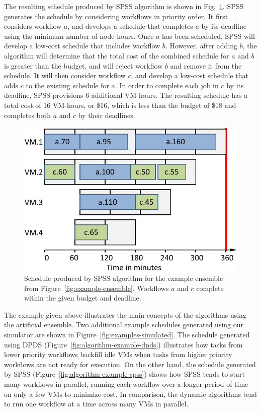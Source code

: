 \documentclass[preprint,5p]{elsarticle}
\begin{document}
The resulting schedule produced by SPSS algorithm is shown in
Fig.~\ref{fig:algorithms-example-spss}. SPSS generates the schedule by
considering workflows in priority order. It first considers workflow $a$, and
develops a schedule that completes $a$ by its deadline using the minimum
number of node-hours. Once $a$ has been scheduled, SPSS will develop a
low-cost schedule that includes workflow $b$. However, after adding $b$,
the algorithm will determine that the total cost of the combined schedule
for $a$ and $b$ is greater than the budget, and will reject workflow $b$ and
remove it from the schedule. It will then consider workflow $c$, and develop
a low-cost schedule that adds $c$ to the existing schedule for $a$. In order
to complete each job in $c$ by its deadline, SPSS provisions 6 additional
VM-hours. The resulting schedule has a total cost of 16 VM-hours, or
\$16, which is less than the budget of \$18 and completes both $a$ and $c$ by
their deadlines.

\begin{figure}[htb] 
  \centering
  \includegraphics[width=0.80\columnwidth]{figures/algorithms-example-spss}
  \caption{Schedule produced by SPSS algorithm for the example ensemble from Figure~\ref{fig:example-ensemble}.
  Workflows $a$ and $c$ complete within the given budget and deadline.}
  \label{fig:algorithms-example-spss}
\end{figure}

The example given above illustrates the main concepts of the algorithms using the artificial ensemble.
Two additional example schedules generated using our simulator are shown in 
Figure~\ref{fig:examples-simulated}. 
The schedule generated using DPDS (Figure~\ref{fig:algorithm-example-dpds})
illustrates how tasks from lower priority workflows backfill idle VMs when
tasks from higher priority workflows are not ready for execution.
On the other hand, the schedule generated by SPSS (Figure~\ref{fig:algorithm-example-spss})
shows how SPSS tends to start many workflows in parallel, running each workflow
over a longer period of time on only a few VMs to minimize cost. In comparison,
the dynamic algorithms tend to run one workflow at a time across many VMs in
parallel.
\end{document}
